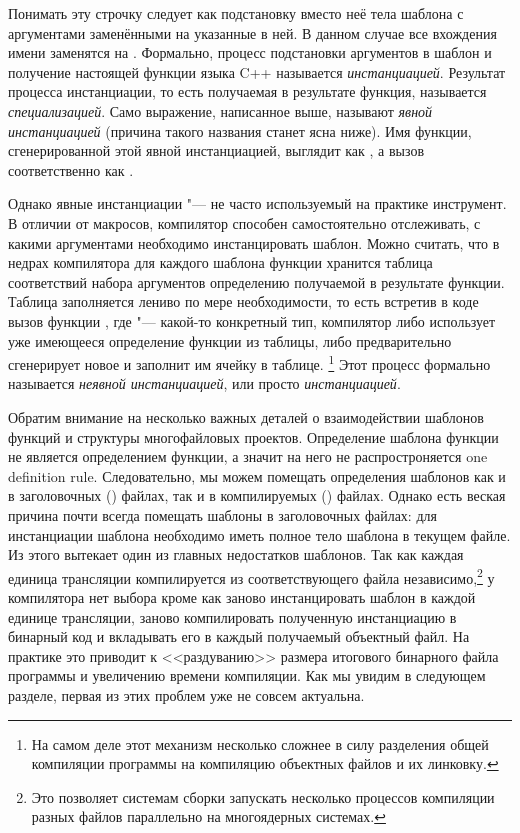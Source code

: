 Понимать эту строчку следует как подстановку вместо неё тела шаблона с аргументами заменёнными на указанные в ней.
В данном случае все вхождения имени  заменятся на .
Формально, процесс подстановки аргументов в шаблон и получение настоящей функции языка C++ называется \textit{инстанциацией}.
Результат процесса инстанциации, то есть получаемая в результате функция, называется \textit{специализацией}.
Само выражение, написанное выше, называют \textit{явной инстанциацией} (причина такого названия станет ясна ниже).
Имя функции, сгенерированной этой явной инстанциацией, выглядит как , а вызов соответственно как .

Однако явные инстанциации "--- не часто используемый на практике инструмент.
В отличии от макросов, компилятор способен самостоятельно отслеживать, с какими аргументами необходимо инстанцировать шаблон.
Можно считать, что в недрах компилятора для каждого шаблона функции хранится таблица соответствий набора аргументов определению получаемой в результате функции.
Таблица заполняется лениво по мере необходимости, то есть встретив в коде вызов функции , где  "--- какой-то конкретный тип, компилятор либо использует уже имеющееся определение функции из таблицы, либо предварительно сгенерирует новое и заполнит им ячейку в таблице.
\footnote{На самом деле этот механизм несколько сложнее в силу разделения общей компиляции программы на компиляцию объектных файлов и их линковку.}
Этот процесс формально называется \textit{неявной инстанциацией}, или просто \textit{инстанциацией}.

Обратим внимание на несколько важных деталей о взаимодействии шаблонов функций и структуры многофайловых проектов.
Определение шаблона функции не является определением функции, а значит на него не распростроняется one definition rule.
Следовательно, мы можем помещать определения шаблонов как и в заголовочных () файлах, так и в компилируемых () файлах.
Однако есть веская причина почти всегда помещать шаблоны в заголовочных файлах: для инстанциации шаблона необходимо иметь полное тело шаблона в текущем файле.
Из этого вытекает один из главных недостатков шаблонов.
Так как каждая единица трансляции компилируется из соответствующего  файла независимо,\footnote{Это позволяет системам сборки запускать несколько процессов компиляции разных файлов параллельно на многоядерных системах.} у компилятора нет выбора кроме как заново инстанцировать шаблон в каждой единице трансляции, заново компилировать полученную инстанциацию в бинарный код и вкладывать его в каждый получаемый объектный файл.
На практике это приводит к <<раздуванию>> размера итогового бинарного файла программы и увеличению времени компиляции.
Как мы увидим в следующем разделе, первая из этих проблем уже не совсем актуальна.

